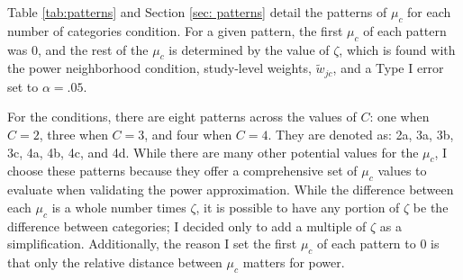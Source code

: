 Table \ref{tab:patterns} and Section \ref{sec: patterns} detail the patterns of $\mu_c$ for each number of categories condition. For a given pattern, the first $\mu_c$ of each pattern was 0, and the rest of the $\mu_c$ is determined by the value of $\zeta$, which is found with the power neighborhood condition, study-level weights, $\tilde{w}_{jc}$, and a Type I error set to $\alpha = .05$. 

For the conditions, there are eight patterns across the values of $C$: one when $C = 2$, three when $C = 3$, and four when $C = 4$. They are denoted as:  2a, 3a, 3b, 3c, 4a, 4b, 4c, and 4d.  While there are many other potential values for the $\mu_c$, I choose these patterns because they offer a comprehensive set of $\mu_c$ values to evaluate when validating the power approximation. While the difference between each $\mu_c$ is a whole number times $\zeta$, it is possible to have any portion of $\zeta$ be the difference between categories; I decided only to add a multiple of $\zeta$ as a simplification. Additionally, the reason I set the first $\mu_c$ of each pattern to $0$ is that only the relative distance between $\mu_c$ matters for power. 





